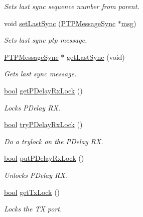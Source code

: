 \begin{DoxyCompactItemize}
\begin{DoxyCompactList}\small\item\em Sets last sync sequence number from parent. \end{DoxyCompactList}\item 
void \hyperlink{class_ether_port_a4132288d6f88b0730c2ee16551349599}{set\+Last\+Sync} (\hyperlink{class_p_t_p_message_sync}{P\+T\+P\+Message\+Sync} $\ast$\hyperlink{openavb__log_8c_a0c7e58a50354c4a4d6dad428d0e47029}{msg})
\begin{DoxyCompactList}\small\item\em Sets last sync ptp message. \end{DoxyCompactList}\item 
\hyperlink{class_p_t_p_message_sync}{P\+T\+P\+Message\+Sync} $\ast$ \hyperlink{class_ether_port_afeda7e4f1cc250fbbc197ed52a98866f}{get\+Last\+Sync} (void)
\begin{DoxyCompactList}\small\item\em Gets last sync message. \end{DoxyCompactList}\item 
\hyperlink{avb__gptp_8h_af6a258d8f3ee5206d682d799316314b1}{bool} \hyperlink{class_ether_port_af6fad8273e6daf285a498eb5bd370f33}{get\+P\+Delay\+Rx\+Lock} ()
\begin{DoxyCompactList}\small\item\em Locks P\+Delay RX. \end{DoxyCompactList}\item 
\hyperlink{avb__gptp_8h_af6a258d8f3ee5206d682d799316314b1}{bool} \hyperlink{class_ether_port_a138c4cc138f701511969440550ddf6fb}{try\+P\+Delay\+Rx\+Lock} ()
\begin{DoxyCompactList}\small\item\em Do a trylock on the P\+Delay RX. \end{DoxyCompactList}\item 
\hyperlink{avb__gptp_8h_af6a258d8f3ee5206d682d799316314b1}{bool} \hyperlink{class_ether_port_ac3dbd72b9e569adec3b986677e1bd5b0}{put\+P\+Delay\+Rx\+Lock} ()
\begin{DoxyCompactList}\small\item\em Unlocks P\+Delay RX. \end{DoxyCompactList}\item 
\hyperlink{avb__gptp_8h_af6a258d8f3ee5206d682d799316314b1}{bool} \hyperlink{class_ether_port_a0b26edd5fdba45bbfe2686051882a224}{get\+Tx\+Lock} ()
\begin{DoxyCompactList}\small\item\em Locks the TX port. \end{DoxyCompactList}\item 

\end{DoxyCompactItemize}
